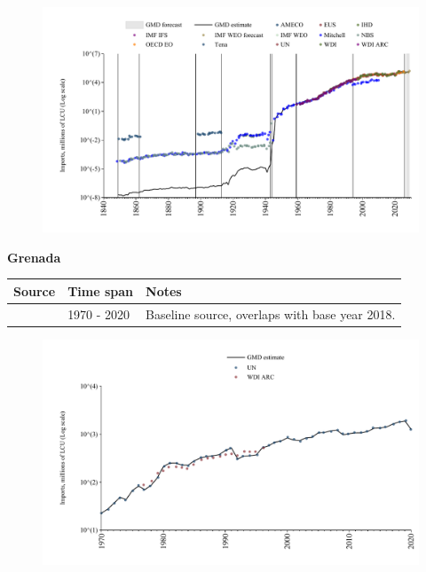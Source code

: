 \documentclass[12pt,a4paper,landscape]{article}
\begin{document}
\begin{adjustbox}{max totalsize={\paperwidth}{\paperheight},center}
\begin{minipage}[t][\textheight][t]{\textwidth}
\begin{figure}[H]
\includegraphics[width=\textwidth,height=0.6\textheight,keepaspectratio]{graphs/GRC_imports.pdf}
\end{figure}
\end{minipage}
\end{adjustbox}
\begin{adjustbox}{max totalsize={\paperwidth}{\paperheight},center}
\begin{minipage}[t][\textheight][t]{\textwidth}
\vspace*{0.5cm}
{}
\begin{center}
{\Large\bfseries Grenada}
\end{center}
\vspace{0.5cm}
\begin{table}[H]
\centering
\small
\begin{tabular}{|l|l|l|}
\hline
\textbf{Source} & \textbf{Time span} & \textbf{Notes} \\
\hline
\rowcolor{white}\cite{UN}& 1970 - 2020 &Baseline source, overlaps with base year 2018.\\
\hline
\end{tabular}
\end{table}
\begin{figure}[H]
\centering
\includegraphics[width=\textwidth,height=0.6\textheight,keepaspectratio]{graphs/GRD_imports.pdf}
\end{figure}
\end{minipage}
\end{adjustbox}
\end{document}
